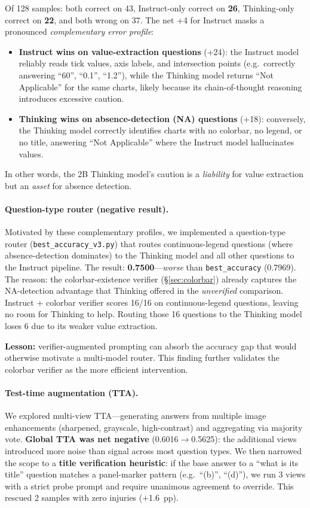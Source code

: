 \documentclass{article}
\begin{document}
Of 128 samples: both correct on 43, Instruct-only correct on \textbf{26},
Thinking-only correct on \textbf{22}, and both wrong on 37. The net +4 for
Instruct masks a pronounced \emph{complementary error profile}:
\begin{itemize}
  \item \textbf{Instruct wins on value-extraction questions} (+24):
    the Instruct model reliably reads tick values, axis labels, and
    intersection points (e.g.\ correctly answering ``60'', ``0.1'', ``1.2''),
    while the Thinking model returns ``Not Applicable'' for the same charts,
    likely because its chain-of-thought reasoning introduces excessive caution.
  \item \textbf{Thinking wins on absence-detection (NA) questions} (+18):
    conversely, the Thinking model correctly identifies charts with no
    colorbar, no legend, or no title, answering ``Not Applicable'' where the
    Instruct model hallucinates values.
\end{itemize}
In other words, the 2B Thinking model's caution is a \emph{liability} for
value extraction but an \emph{asset} for absence detection.

\paragraph{Question-type router (negative result).}
Motivated by these complementary profiles, we implemented a question-type
router (\texttt{best\_accuracy\_v3.py}) that routes continuous-legend
questions (where absence-detection dominates) to the Thinking model and
all other questions to the Instruct pipeline.  The result:
\textbf{0.7500}---\emph{worse} than \texttt{best\_accuracy} (0.7969).
The reason: the colorbar-existence verifier (\S\ref{sec:colorbar}) already
captures the NA-detection advantage that Thinking offered in the
\emph{unverified} comparison.  Instruct + colorbar verifier scores 16/16
on continuous-legend questions, leaving no room for Thinking to help.
Routing those 16 questions to the Thinking model loses 6 due to its
weaker value extraction.

\textbf{Lesson:} verifier-augmented prompting can absorb the accuracy gap
that would otherwise motivate a multi-model router.  This finding further
validates the colorbar verifier as the more efficient intervention.

\paragraph{Test-time augmentation (TTA).}
We explored multi-view TTA---generating answers from multiple image
enhancements (sharpened, grayscale, high-contrast) and aggregating via majority
vote. \textbf{Global TTA was net negative} (0.6016$\to$0.5625): the additional
views introduced more noise than signal across most question types. We then
narrowed the scope to a \textbf{title verification heuristic}: if the base
answer to a ``what is its title'' question matches a panel-marker pattern
(e.g.\ ``(b)'', ``(d)''), we run 3 views with a strict probe prompt and
require unanimous agreement to override. This rescued 2 samples with zero
injuries (+1.6~pp).
\end{document}

